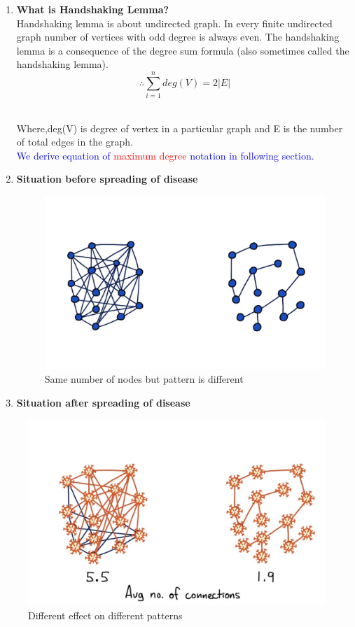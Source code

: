 \documentclass[12pt]{article}
\begin{document}
\begin{enumerate}
\item {\bf{What is Handshaking Lemma?}}
\\
[1 cm]
Handshaking lemma is about undirected graph. In every finite undirected graph number of vertices with odd degree is always even. The handshaking lemma is a consequence of the degree sum formula (also sometimes called the handshaking lemma)\cite{nj3}.
$$\therefore \boxed{\sum_{i=1}^{n} deg(V) = 2|E|}$$
\\
[1 mm]
\par Where,deg(V) is degree of vertex in a particular graph and E is the number of total edges in the graph.\\
[1 cm]

\textcolor{blue}{We derive equation of \textcolor{red}{ maximum degree} notation in following section.}
\\
[1 mm]
\item {\bf{Situation before spreading of disease}}

\begin{figure}[H]
\includegraphics[width=\textwidth]{1st.jpeg}
\caption{Same number of nodes but pattern is different\cite{nj4}}
\end{figure}
\item {\bf{Situation after spreading of disease}}
\end{enumerate}
\begin{figure}[H]
\includegraphics[width=\textwidth]{1st_condition_effect.jpeg}
\caption{Different effect on different patterns\cite{nj4}}
\end{figure}
\end{document}
